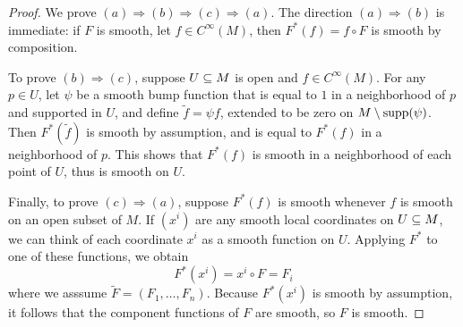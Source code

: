 \begin{proof}
We prove $(a)\Rightarrow(b)\Rightarrow(c)\Rightarrow(a)$. The direction $(a)\Rightarrow(b)$ is immediate: if $F$ is smooth, let $f\in C^\infty(M)$, then $F^*(f)=f\circ F$ is smooth by composition.\par
To prove $(b)\Rightarrow(c)$, suppose $U\subseteq M$ is open and $f\in C^\infty(M)$. For any $p\in U$, let $\psi$ be a smooth bump function that is equal to $1$ in a neighborhood of $p$ and supported in $U$, and define $\widetilde{f}=\psi f$, extended to be zero on $M\setminus\mathrm{supp}(\psi)$. Then $F^*(\widetilde{f})$ is smooth by assumption, and is equal to $F^*(f)$ in a neighborhood of $p$. This shows that $F^*(f)$ is smooth in a neighborhood of each point of $U$, thus is smooth on $U$.\par
Finally, to prove $(c)\Rightarrow(a)$, suppose $F^*(f)$ is smooth whenever $f$ is smooth on an open subset of $M$. If $(x^i)$ are any smooth local coordinates on $U\subseteq M$, we can think of each coordinate $x^i$ as a smooth function on $U$. Applying $F^*$ to one of these functions, we obtain
\[F^*(x^i)=x^i\circ F=F_i\]
where we asssume $\widetilde{F}=(F_1,\dots,F_n)$. Because $F^*(x^i)$ is smooth by assumption, it follows that the component functions of $F$ are smooth, so $F$ is smooth.
\end{proof}
